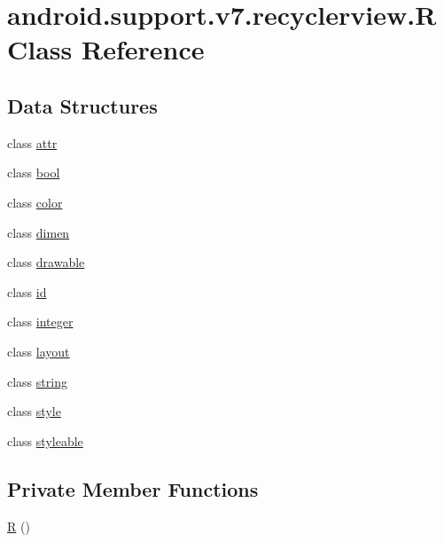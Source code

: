 \hypertarget{classandroid_1_1support_1_1v7_1_1recyclerview_1_1_r}{}\section{android.\+support.\+v7.\+recyclerview.\+R Class Reference}
\label{classandroid_1_1support_1_1v7_1_1recyclerview_1_1_r}
\subsection*{Data Structures}
\begin{DoxyCompactItemize}
\item 
class \mbox{\hyperlink{classandroid_1_1support_1_1v7_1_1recyclerview_1_1_r_1_1attr}{attr}}
\item 
class \mbox{\hyperlink{classandroid_1_1support_1_1v7_1_1recyclerview_1_1_r_1_1bool}{bool}}
\item 
class \mbox{\hyperlink{classandroid_1_1support_1_1v7_1_1recyclerview_1_1_r_1_1color}{color}}
\item 
class \mbox{\hyperlink{classandroid_1_1support_1_1v7_1_1recyclerview_1_1_r_1_1dimen}{dimen}}
\item 
class \mbox{\hyperlink{classandroid_1_1support_1_1v7_1_1recyclerview_1_1_r_1_1drawable}{drawable}}
\item 
class \mbox{\hyperlink{classandroid_1_1support_1_1v7_1_1recyclerview_1_1_r_1_1id}{id}}
\item 
class \mbox{\hyperlink{classandroid_1_1support_1_1v7_1_1recyclerview_1_1_r_1_1integer}{integer}}
\item 
class \mbox{\hyperlink{classandroid_1_1support_1_1v7_1_1recyclerview_1_1_r_1_1layout}{layout}}
\item 
class \mbox{\hyperlink{classandroid_1_1support_1_1v7_1_1recyclerview_1_1_r_1_1string}{string}}
\item 
class \mbox{\hyperlink{classandroid_1_1support_1_1v7_1_1recyclerview_1_1_r_1_1style}{style}}
\item 
class \mbox{\hyperlink{classandroid_1_1support_1_1v7_1_1recyclerview_1_1_r_1_1styleable}{styleable}}
\end{DoxyCompactItemize}
\subsection*{Private Member Functions}
\begin{DoxyCompactItemize}
\item 
\mbox{\hyperlink{classandroid_1_1support_1_1v7_1_1recyclerview_1_1_r_aa060a454ea7ef2c32580bebc95d5456f}{R}} ()
\end{DoxyCompactItemize}


